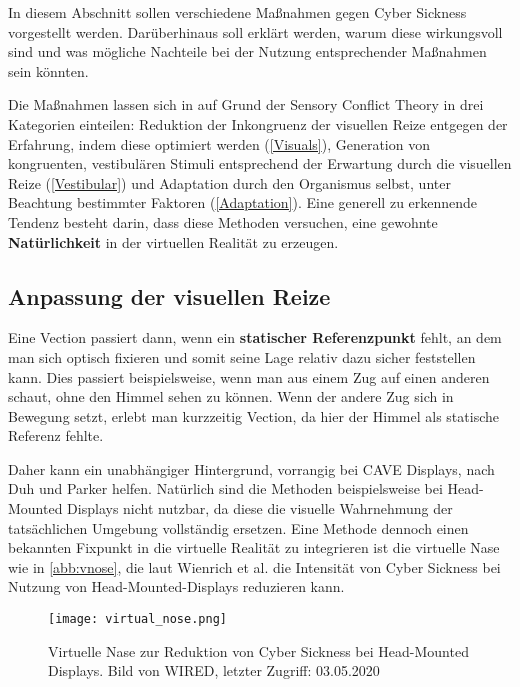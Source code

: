 In diesem Abschnitt sollen verschiedene Ma{\ss}nahmen gegen Cyber Sickness vorgestellt werden. Dar\"uberhinaus soll erkl\"art werden, warum diese wirkungsvoll sind und was m\"ogliche Nachteile bei der Nutzung entsprechender Ma{\ss}nahmen sein k\"onnten.

Die Ma{\ss}nahmen lassen sich in auf Grund der Sensory Conflict Theory in drei Kategorien einteilen: 
Reduktion der Inkongruenz der visuellen Reize entgegen der Erfahrung, indem diese optimiert werden (\autoref{Visuals}), Generation von kongruenten, vestibul\"aren Stimuli entsprechend der Erwartung durch die visuellen Reize (\autoref{Vestibular}) und Adaptation durch den Organismus selbst, unter Beachtung bestimmter Faktoren (\autoref{Adaptation}). Eine generell zu erkennende Tendenz besteht darin, dass diese Methoden versuchen, eine gewohnte \textbf{Nat\"urlichkeit} in der virtuellen Realit\"at zu erzeugen.

\subsection{Anpassung der visuellen Reize}\label{Visuals}

Eine Vection passiert dann, wenn ein \textbf{statischer Referenzpunkt} fehlt, an dem man sich optisch fixieren und somit seine Lage relativ dazu sicher feststellen kann. Dies passiert beispielsweise, wenn man aus einem Zug auf einen anderen schaut, ohne den Himmel sehen zu k\"onnen. Wenn der andere Zug sich in Bewegung setzt, erlebt man kurzzeitig Vection, da hier der Himmel als statische Referenz fehlte.

Daher kann ein unabh\"angiger Hintergrund, vorrangig bei CAVE Displays, nach Duh und Parker \cite{Duh:2001:Static} helfen. Nat\"urlich sind die Methoden beispielsweise bei Head-Mounted Displays nicht nutzbar, da diese die visuelle Wahrnehmung der tats\"achlichen Umgebung vollst\"andig ersetzen. Eine Methode dennoch einen bekannten Fixpunkt in die virtuelle Realit\"at zu integrieren ist die virtuelle Nase wie in \autoref{abb:vnose}, die laut Wienrich et al.\cite{Wienrich:2018:Nose} die Intensit\"at von Cyber Sickness bei Nutzung von Head-Mounted-Displays reduzieren kann.

\begin{figure}[t]
	\centering 
	\texttt{[image: virtual\_nose.png]}
	\caption{Virtuelle Nase zur Reduktion von Cyber Sickness bei Head-Mounted Displays. Bild von WIRED\cite{WIRED:2020:Nose}, letzter Zugriff: 03.05.2020}
	\label{abb:vnose}
\end{figure}

